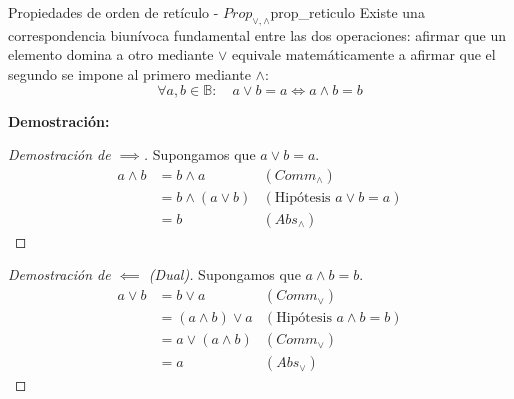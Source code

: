 \documentclass[12pt,a4paper]{article}
\newcommand{\desplegable}[2]{%
  \par\vspace{1ex}\noindent
  \textbf{Demostración:}
  \vspace{1ex}
  
  #2
  \par\vspace{1ex}
}
\begin{document}
\begin{teorema}{Propiedades de orden de retículo - $Prop_{\vee,\wedge}$}{prop_reticulo}
Existe una correspondencia biunívoca fundamental entre las dos operaciones: afirmar que un elemento domina a otro mediante $\vee$ equivale matemáticamente a afirmar que el segundo se impone al primero mediante $\wedge$:
\[ \forall a, b \in \mathbb{B}: \quad a \vee b = a \iff a \wedge b = b \]
\end{teorema}
\desplegable{proof_prop_reticulo}{
\begin{proof}[Demostración de $\implies$]
Supongamos que $a \vee b = a$.
\begin{align*}
    a \wedge b &= b \wedge a & (Comm_\wedge) \\
               &= b \wedge (a \vee b) & (\text{Hipótesis } a \vee b = a) \\
               &= b & (Abs_\wedge)
\end{align*}
\end{proof}
\begin{proof}[Demostración de $\impliedby$ (Dual)]
Supongamos que $a \wedge b = b$.
\begin{align*}
    a \vee b &= b \vee a & (Comm_\vee) \\
               &= (a \wedge b) \vee a & (\text{Hipótesis } a \wedge b = b) \\
               &= a \vee (a \wedge b) & (Comm_\vee) \\
               &= a & (Abs_\vee)
\end{align*}
\end{proof}
}
\end{document}
